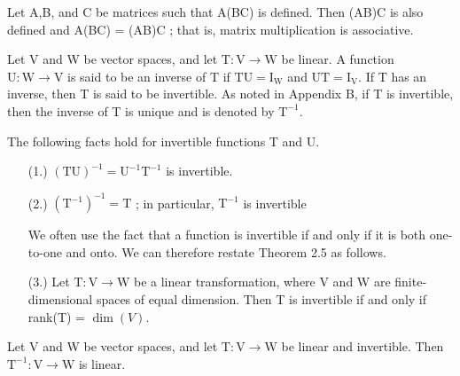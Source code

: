 \begin{thm*}[2.16]$ $\\
Let A,B, and C be matrices such that A(BC) is defined. Then (AB)C is also defined and A(BC) = (AB)C ; that is, matrix multiplication is associative.	
\end{thm*}

\newpage

\begin{defn} $ $\\
	Let V and W be vector spaces, and let $\mathrm{T} : \mathrm{V} \rightarrow \mathrm{W}$ be linear. A function $\mathrm{U} : \mathrm{W} \rightarrow \mathrm{V}$ is said to be an inverse of T if $\mathrm{T} \mathrm{U} = \mathrm{I}_\mathrm{W}$ and $\mathrm{U} \mathrm{T} = \mathrm{I}_\mathrm{V}$. If T has an inverse, then T is said to be invertible. As noted in Appendix B, if T is invertible, then the inverse of T is unique and is denoted by $\mathrm{T}^{-1}$.

	
\begin{center}
	The following facts hold for invertible functions T and U.
\end{center}
	\begin{enumerate}
	
	\item [(1.)] $(\mathrm{T}\mathrm{U})^{-1} = \mathrm{U}^{-1}\mathrm{T}^{-1}$ is invertible.
	
	\item[(2.)] $(\mathrm{T}^{-1})^{-1} = \mathrm{T}$ ; in particular, $\mathrm{T}^{-1}$ is invertible 

	\item[] We often use the fact that a function is invertible if and only if it is both one-to-one and onto. We can therefore restate Theorem 2.5 as follows.
		
	\item [(3.)] Let $\mathrm{T} : \mathrm{V} \rightarrow \mathrm{W}$ be a linear transformation, where V and W are finite-dimensional spaces of equal dimension. Then T is invertible if and only if rank(T) = $\dim(V)$.
	\end{enumerate}

\end{defn}

\begin{thm*}[2.17]$ $\\
	Let V and W be vector spaces, and let $\mathrm{T} : \mathrm{V} \rightarrow \mathrm{W}$ be linear and invertible. Then $\mathrm{T}^{-1} : \mathrm{V} \rightarrow \mathrm{W}$ is linear.
\end{thm*}

